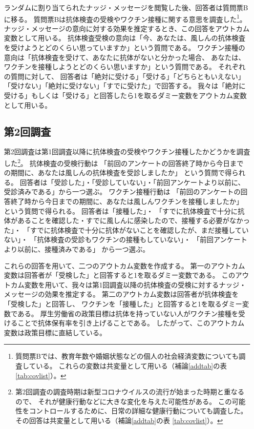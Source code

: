 \documentclass[
  11pt,
  a4paper,
]{article}
\begin{document}
ランダムに割り当てられたナッジ・メッセージを閲覧した後、回答者は質問票Bに移る。
質問票Bは抗体検査の受検やワクチン接種に関する意思を調査した\footnote{質問票Bでは、教育年数や婚姻状態などの個人の社会経済変数についても調査している。
  これらの変数は共変量として用いる（補論\ref{addtab}の表 \ref{tab:covlist}）。}。
ナッジ・メッセージの意向に対する効果を推定するとき、この回答をアウトカム変数として用いる。
抗体検査受検の意向は「今、あなたは、風しんの抗体検査を受けようとどのくらい思っていますか」という質問である。
ワクチン接種の意向は「抗体検査を受けて、あなたに抗体がないと分かった場合、
あなたは、ワクチンを接種しようとどのくらい思いますか」という質問である。
それぞれの質問に対して、
回答者は「絶対に受ける」「受ける」「どちらともいえない」「受けない」「絶対に受けない」「すでに受けた」で回答する。
我々は「絶対に受ける」もしくは「受ける」と回答したら1を取るダミー変数をアウトカム変数として用いる。

\hypertarget{wave2}{%
\subsection{第2回調査}\label{wave2}}

第2回調査は第1回調査以降に抗体検査の受検やワクチン接種したかどうかを調査した\footnote{第2回調査の調査時期は新型コロナウイルスの流行が始まった時期と重なるので、
  それが健康行動などに大きな変化を与えた可能性がある。
  この可能性をコントロールするために、日常の詳細な健康行動についても調査した。
  その回答は共変量として用いる（補論\ref{addtab}の表 \ref{tab:covlist}）。}。
抗体検査の受検行動は
「前回のアンケートの回答終了時から今日までの期間に、あなたは風しんの抗体検査を受診しましたか」
という質問で得られる。
回答者は「受診した」・「受診していない」・「前回アンケートより以前に、受診済みである」から一つ選ぶ。
ワクチン接種行動は
「前回のアンケートの回答終了時から今日までの期間に、あなたは風しんワクチンを接種しましたか」
という質問で得られる。
回答者は「接種した」・
「すでに抗体検査で十分に抗体があることを確認した・すでに風しんに感染したので、接種する必要がなかった」・
「すでに抗体検査で十分に抗体がないことを確認したが、まだ接種していない」・
「抗体検査の受診もワクチンの接種もしていない」・
「前回アンケートより以前に、接種済みである」
から一つ選ぶ。

これらの回答を用いて、二つのアウトカム変数を作成する。
第一のアウトカム変数は回答者が「受検した」と回答すると1を取るダミー変数である。
このアウトカム変数を用いて、我々は第1回調査以降の抗体検査の受検に対するナッジ・メッセージの効果を推定する。
第二のアウトカム変数は回答者が抗体検査を「受検した」と回答し、
ワクチンを「接種した」と回答すると1を取るダミー変数である。
厚生労働省の政策目標は抗体を持っていない人がワクチン接種を受けることで抗体保有率を引き上げることである。
したがって、このアウトカム変数は政策目標に直結している。
\end{document}
